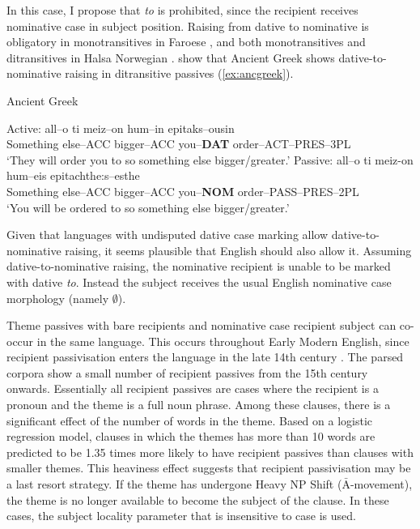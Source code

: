 In this case, I propose that \textit{to} is prohibited, since the recipient receives nominative case in subject position. Raising from dative to nominative is obligatory in monotransitives in Faroese \citep{Barnes.1986,Hoskuldurrainsson.2004}, and both monotransitives and ditransitives in Halsa Norwegian \citep{Eyorsson.2012}. \cite{Alexiadou.2013,Alexiadou.2013b} show that Ancient Greek shows dative-to-nominative raising in ditransitive passives (\ref{ex:ancgreek}).
\begin{exe}
\ex\label{ex:ancgreek} Ancient Greek \citep[ex. 2]{Alexiadou.2013b}
\begin{xlist}
\ex Active: \gll all--o ti meiz--on hum--in epitaks--ousin\\
{Something else}--ACC bigger--ACC you--\textbf{DAT} order--ACT--PRES--3PL\\
\trans `They will order you to so something else bigger/greater.'
\ex Passive: \gll all--o ti meiz-on hum--eis epitachthe:s--esthe\\
{Something else}--ACC bigger--ACC you--\textbf{NOM} order--PASS--PRES--2PL\\
\trans `You will be ordered to so something else bigger/greater.' 
\end{xlist}
\end{exe}%
Given that languages with undisputed dative case marking allow dative-to-nominative raising, it seems plausible that English should also allow it. Assuming dative-to-nominative raising, the nominative recipient is unable to be marked with dative \textit{to}. Instead the subject receives the usual English nominative case morphology (namely $\emptyset$).



Theme passives with bare recipients and nominative case recipient subject can co-occur in the same language. This occurs throughout Early Modern English, since recipient passivisation enters the language in the late 14th century \citep{Allen.1999}. The parsed corpora show a small number of recipient passives from the 15th century onwards. Essentially all recipient passives are cases where the recipient is a pronoun and the theme is a full noun phrase. Among these clauses, there is a significant effect of the number of words in the theme. Based on a logistic regression model, clauses in which the themes has more than 10 words are predicted to be 1.35 times more likely to have recipient passives than clauses with smaller themes. This heaviness effect suggests that recipient passivisation may be a last resort strategy. If the theme has undergone Heavy NP Shift ($\bar{\text{A}}$-movement), the theme is no longer available to become the subject of the clause. In these cases, the subject locality parameter that is insensitive to case is used.

